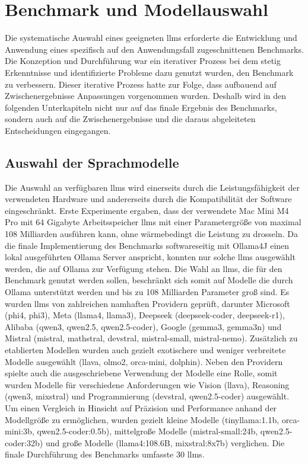 \chapter{Benchmark und Modellauswahl}\label{ch:benchmark}

Die systematische Auswahl eines geeigneten \glspl{llm} erforderte die Entwicklung und Anwendung eines spezifisch auf den Anwendungsfall zugeschnittenen Benchmarks.
Die Konzeption und Durchführung war ein iterativer Prozess bei dem stetig Erkenntnisse und identifizierte Probleme dazu genutzt wurden, den Benchmark zu verbessern.
Dieser iterative Prozess hatte zur Folge, dass aufbauend auf Zwischenergebnisse Anpassungen vorgenommen wurden.
Deshalb wird in den folgenden Unterkapiteln nicht nur auf das finale Ergebnis des Benchmarks, sondern auch auf die Zwischenergebnisse und die daraus abgeleiteten Entscheidungen eingegangen.


\section{Auswahl der Sprachmodelle}\label{sec:modelle-benchmark}

Die Auswahl an verfügbaren \glspl{llm} wird einerseits durch die Leistungsfähigkeit der verwendeten Hardware und andererseits durch die Kompatibilität der Software eingeschränkt.
Erste Experimente ergaben, dass der verwendete Mac Mini M4 Pro mit 64 Gigabyte Arbeitsspeicher \glspl{llm} mit einer Parametergröße von maximal 108 Milliarden ausführen kann, ohne wärmebedingt die Leistung zu drosseln.
Da die finale Implementierung des Benchmarks softwareseitig mit Ollama4J einen lokal ausgeführten Ollama Server anspricht, konnten nur solche \glspl{llm} ausgewählt werden, die auf Ollama zur Verfügung stehen.
Die Wahl an \glspl{llm}, die für den Benchmark genutzt werden sollen, beschränkt sich somit auf Modelle die durch Ollama unterstützt werden und bis zu 108 Milliarden Parameter groß sind.
Es wurden \glspl{llm} von zahlreichen namhaften Providern geprüft, darunter Microsoft (phi4, phi3), Meta (llama4, llama3), Deepseek (deepseek-coder, deepseek-r1), Alibaba (qwen3, qwen2.5, qwen2.5-coder), Google (gemma3, gemma3n) und Mistral (mistral, mathstral, devstral, mistral-small, mistral-nemo).
Zusätzlich zu etablierten Modellen wurden auch gezielt exotischere und weniger verbreitete Modelle ausgewählt (llava, olmo2, orca-mini, dolphin).
Neben den Providern spielte auch die ausgeschriebene Verwendung der Modelle eine Rolle, somit wurden Modelle für verschiedene Anforderungen wie Vision (llava), Reasoning (qwen3, mixstral) und Programmierung (devstral, qwen2.5-coder) ausgewählt.
Um einen Vergleich in Hinsicht auf Präzision und Performance anhand der Modellgröße zu ermöglichen, wurden gezielt kleine Modelle (tinyllama:1.1b, orca-mini:3b, qwen2.5-coder:0.5b), mittelgroße Modelle (mistral-small:24b, qwen2.5-coder:32b) und große Modelle (llama4:108.6B, mixstral:8x7b) verglichen.
Die finale Durchführung des Benchmarks umfasste 30 \glspl{llm}.

